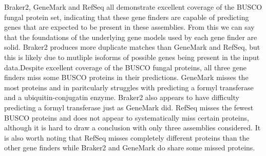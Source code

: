 Braker2, GeneMark and RefSeq all demonstrate excellent coverage of the
BUSCO fungal protein set, indicating that these gene finders are
capable of predicting genes that are expected to be present in these
assemblies. From this we can say that the foundations of the
underlying gene models used by each gene finder are solid. Braker2
produces more duplicate matches than GeneMark and RefSeq, but this is
likely due to mutliple isoforms of possible genes being present in the
input data.Despite excellent coverage of the BUSCO fungal proteins,
all three gene finders miss some BUSCO proteins in their
predictions. GeneMark misses the most proteins and in paritcularly
struggles with predicting a formyl transferase and a
ubiquitin-conjugatin enzyme. Braker2 also appears to have difficulty
predicting a formyl transferase just as GeneMark did. RefSeq misses
the fewest BUSCO proteins and does not appear to systematically miss
certain proteins, although it is hard to draw a conclusion with only
three assemblies considered. It is also worth noting that RefSeq
misses completely different proteins than the other gene finders while
Braker2 and GeneMark do share some missed proteins.
